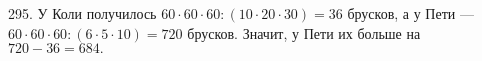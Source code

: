 295. У Коли получилось $60\cdot60\cdot60:(10\cdot20\cdot30)=36$ брусков, а у Пети --- $60\cdot60\cdot60:(6\cdot5\cdot10)=720$ брусков. Значит, у Пети их больше на $720-36=684.$\\
